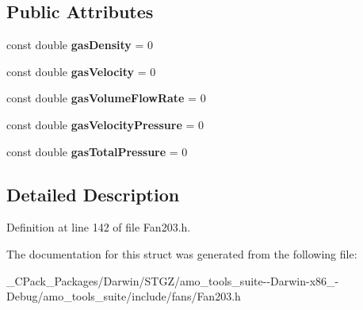 \subsection*{Public Attributes}
\begin{DoxyCompactItemize}
\item 
\mbox{\label{struct_plane_data_1_1_node_binding_1_1_data_ab95d17426cc7d8141e904baf96a12340}} 
const double {\bfseries gas\+Density} = 0
\item 
\mbox{\label{struct_plane_data_1_1_node_binding_1_1_data_a334b80114bbe976623a7e24fbd546d51}} 
const double {\bfseries gas\+Velocity} = 0
\item 
\mbox{\label{struct_plane_data_1_1_node_binding_1_1_data_a5cbd28074d5a930f0267a9d60b83a04d}} 
const double {\bfseries gas\+Volume\+Flow\+Rate} = 0
\item 
\mbox{\label{struct_plane_data_1_1_node_binding_1_1_data_aa0892de35b2ecc840e2bcdca79f5d1a2}} 
const double {\bfseries gas\+Velocity\+Pressure} = 0
\item 
\mbox{\label{struct_plane_data_1_1_node_binding_1_1_data_a819380996458306f772c305df01d8dba}} 
const double {\bfseries gas\+Total\+Pressure} = 0
\end{DoxyCompactItemize}


\subsection{Detailed Description}


Definition at line 142 of file Fan203.\+h.



The documentation for this struct was generated from the following file\+:\begin{DoxyCompactItemize}
\item 
\+\_\+\+C\+Pack\+\_\+\+Packages/\+Darwin/\+S\+T\+G\+Z/amo\+\_\+tools\+\_\+suite-\/-\/\+Darwin-\/x86\+\_-\/\+Debug/amo\+\_\+tools\+\_\+suite/include/fans/Fan203.\+h\end{DoxyCompactItemize}
